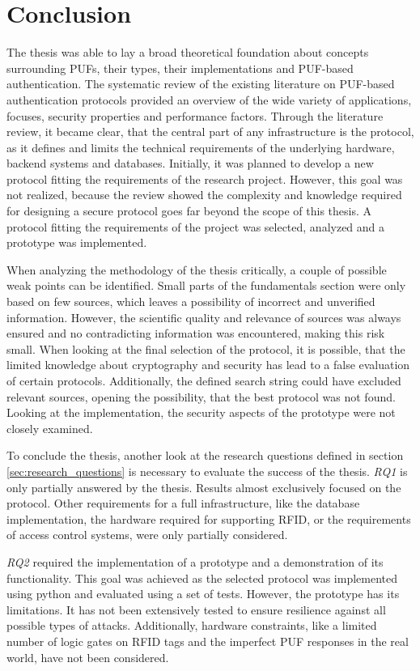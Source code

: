 \newpage
\section{Conclusion}
\label{sec:conclusion}


The thesis was able to lay a broad theoretical foundation about concepts surrounding PUFs, their types,
their implementations and PUF-based authentication.
The systematic review of the existing literature on PUF-based authentication protocols
provided an overview of the wide variety of applications, focuses, security properties
and performance factors. Through the literature review, it became clear, that the central part of any
infrastructure is the protocol, as it defines and limits the technical requirements of the underlying
hardware, backend systems and databases. Initially, it was planned to develop a new protocol fitting
the requirements of the research project. However, this goal was not realized, because the review
showed the complexity and knowledge required for designing a secure protocol goes far beyond
the scope of this thesis. A protocol fitting the requirements of the project was selected,
analyzed and a prototype was implemented.

When analyzing the methodology of the thesis critically, a couple of possible weak points can be identified.
Small parts of the fundamentals section were only based on few sources, which leaves a possibility of
incorrect and unverified information. However, the scientific quality and relevance of sources was always
ensured and no contradicting information was encountered, making this risk small.
When looking at the final selection of the protocol, it is possible, that the limited knowledge about
cryptography and security has lead to a false evaluation of certain protocols.
Additionally, the defined search string could have excluded relevant sources, opening the possibility,
that the best protocol was not found. Looking at the implementation, the security aspects
of the prototype were not closely examined.

To conclude the thesis, another look at the research questions defined in
section \ref{sec:research_questions} is necessary to evaluate the success of the thesis.
\emph{RQ1} is only partially answered by the thesis. Results almost exclusively focused on the protocol.
Other requirements for a full infrastructure, like the database implementation, the hardware required
for supporting RFID, or the requirements of access control systems, were only partially considered.

\emph{RQ2} required the implementation of a prototype and a demonstration of its
functionality. This goal was achieved as the selected protocol was implemented using
python and evaluated using a set of tests.
However, the prototype has its limitations. It has not been extensively tested
to ensure resilience against all possible types of attacks. Additionally, hardware constraints,
like a limited number of logic gates on RFID tags and the imperfect PUF responses in the real world,
have not been considered.